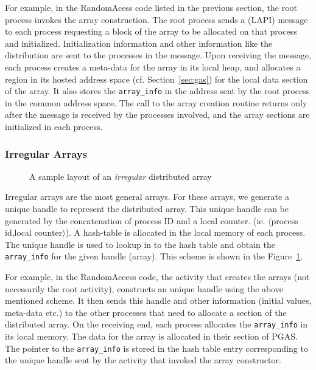 For example, in the RandomAcess code listed in the previous section, the root process
invokes the array construction. The root process sends
a (LAPI) message to each process requesting a block of the array to be allocated
on that process and initialized. Initialization information and other information like the distribution are sent to the
processes in the message. 
Upon receiving the message, each process creates a meta-data for the array
in its local heap, and allocates a region in its hosted address space (cf. Section~\ref{sec:gas})
for the local data section of the array. It also stores the {\tt array\_info}
in the address sent by the root process in the common address space. 
The call to the array creation routine returns only after the message
is received by the processes involved, and the array sections are initialized
in each process. 

\subsubsection{Irregular Arrays}

\begin{figure}
\center
\caption{A sample layout of an {\em irregular} distributed array}
\label{fig:array_layout_irregular}
\end{figure}

Irregular arrays are the most general arrays. For these arrays, we generate
a unique handle to represent the distributed array. This unique handle
can be generated by the concatenation of process ID and a local counter.
(ie. $\langle$process id,local counter$\rangle$). A hash-table is allocated
in the local memory of each process. The unique handle is used to lookup in to
the hash table and obtain the {\tt array\_info} for the given handle (array). 
This scheme is shown in the Figure~\ref{fig:array_layout_irregular}.

For example, in the RandomAccess code, the activity that creates the 
arrays (not necessarily the root activity), constructs an unique handle
using the above mentioned scheme. It then sends this handle and other
information (initial values, meta-data etc.) to the other processes
that need to allocate a section of the distributed array. On the receiving 
end, each process allocates the {\tt array\_info} in its local memory.
The data for the array is allocated in their section of PGAS. The pointer
to the {\tt array\_info} is stored in the hash table entry corresponding
to the unique handle sent by the activity that invoked the array constructor. 

